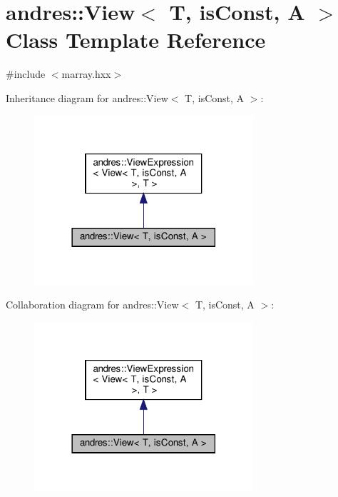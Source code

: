 \hypertarget{classandres_1_1View}{}\section{andres\+:\+:View$<$ T, is\+Const, A $>$ Class Template Reference}
\label{classandres_1_1View}


{\ttfamily \#include $<$marray.\+hxx$>$}



Inheritance diagram for andres\+:\+:View$<$ T, is\+Const, A $>$\+:
\nopagebreak
\begin{figure}[H]
\begin{center}
\leavevmode
\includegraphics[width=230pt]{classandres_1_1View__inherit__graph}
\end{center}
\end{figure}


Collaboration diagram for andres\+:\+:View$<$ T, is\+Const, A $>$\+:
\nopagebreak
\begin{figure}[H]
\begin{center}
\leavevmode
\includegraphics[width=230pt]{classandres_1_1View__coll__graph}
\end{center}
\end{figure}
